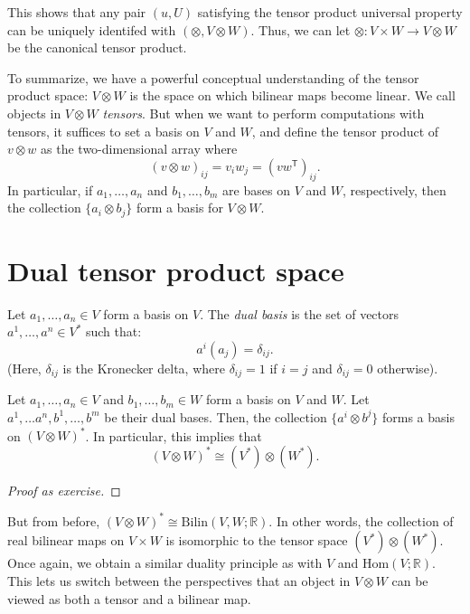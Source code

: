 This shows that any pair $(u,U)$ satisfying the tensor product
universal property can be uniquely identifed with $(\otimes, V \otimes
W)$. Thus, we can let  $\otimes : V \times W \to V \otimes W$ be the
canonical tensor product. 


To summarize, we have a powerful conceptual understanding of the
tensor product space: $V \otimes W$ is the space on which bilinear
maps become linear. We call objects in $V \otimes W$
\emph{tensors}. But when we want to perform computations with tensors,
it suffices to set a basis on $V$ and $W$, and define the tensor
product of $v \otimes w$ as the two-dimensional array where 
\[(v\otimes w)_{ij} = v_i w_j = \left(vw^\mathsf{T}\right)_{ij}.\]
In particular, if $a_1,\dotsc, a_n$ and $b_1,\dotsc, b_m$ are bases on
$V$ and $W$, respectively, then the collection $\{a_i\otimes b_j\}$
form a basis for $V \otimes W$. 


\section{Dual tensor product space}
\begin{definition}
  Let $a_1,\dotsc, a_n \in V$ form a basis on $V$. The \emph{dual
    basis} is the set of vectors $a^1, \dotsc, a^n \in V^*$ such that: 
  \[a^i(a_j) = \delta_{ij}.\]
  (Here, $\delta_{ij}$ is the Kronecker delta, where $\delta_{ij} = 1$
  if $i = j$ and $\delta_{ij} = 0$ otherwise). 
\end{definition}

\begin{proposition}
  Let $a_1,\dotsc, a_n \in V$ and $b_1, \dotsc, b_m \in W$ form a
  basis on $V$ and $W$. Let $a^1,\dotsc a^n, b^1,\dotsc, b^m$ be their
  dual bases. Then, the collection $\{a^i \otimes b^j\}$ forms a basis
  on $(V \otimes W)^*$. In particular, this implies that \[(V \otimes
  W)^* \cong (V^*) \otimes (W^*).\] 
\end{proposition}
\begin{proof}[Proof as exercise]
\end{proof}

But from before, $(V \otimes W)^* \cong \mathrm{Bilin}(V,W;
\mathbb{R})$. In other words, the collection of real bilinear maps on
$V \times W$ is isomorphic to the tensor space $(V^*) \otimes
(W^*)$. Once again, we obtain a similar duality principle as with $V$
and $\mathrm{Hom}(V;\mathbb{R})$. This lets us switch between the
perspectives that an object in $V \otimes W$ can be viewed as both a
tensor and a bilinear map. 

